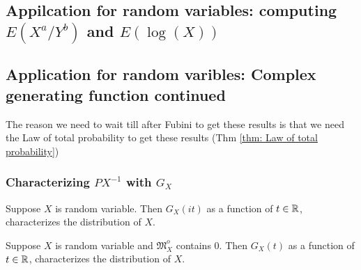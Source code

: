 \begin{shaded}
\subsection{Appilcation for random variables: computing $E(X^a/Y^b)$ and $E(\log(X))$}
\end{shaded}




\begin{shaded}

\subsection{Application for random varibles: Complex generating function continued}




The reason we need to wait till after Fubini to get these results is that we need the Law of total probability to get these results (Thm \ref{thm: Law of total probability})

\subsubsection{Characterizing $PX^{-1}$ with $G_X$}

\begin{theorem}
Suppose $X$ is random variable.  Then
$G_X(it)$ as a function of $t\in \Bbb R$, characterizes the distribution of $X$.
\end{theorem}


\begin{theorem}
Suppose $X$ is random variable and  $\mathfrak M_X^o$ contains $0$. Then $G_X(t)$ as a function of $t\in \Bbb R$, characterizes the distribution of $X$.
\end{theorem}







\end{shaded}
